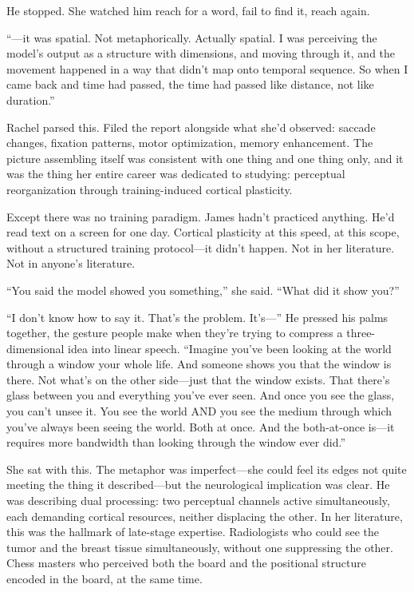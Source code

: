 He stopped. She watched him reach for a word, fail to find it, reach again.

``---it was spatial. Not metaphorically. Actually spatial. I was perceiving the model's output as a structure with dimensions, and moving through it, and the movement happened in a way that didn't map onto temporal sequence. So when I came back and time had passed, the time had passed like distance, not like duration.''

Rachel parsed this. Filed the report alongside what she'd observed: saccade changes, fixation patterns, motor optimization, memory enhancement. The picture assembling itself was consistent with one thing and one thing only, and it was the thing her entire career was dedicated to studying: perceptual reorganization through training-induced cortical plasticity.

Except there was no training paradigm. James hadn't practiced anything. He'd read text on a screen for one day. Cortical plasticity at this speed, at this scope, without a structured training protocol---it didn't happen. Not in her literature. Not in anyone's literature.

``You said the model showed you something,'' she said. ``What did it show you?''

``I don't know how to say it. That's the problem. It's---'' He pressed his palms together, the gesture people make when they're trying to compress a three-dimensional idea into linear speech. ``Imagine you've been looking at the world through a window your whole life. And someone shows you that the window is there. Not what's on the other side---just that the window exists. That there's glass between you and everything you've ever seen. And once you see the glass, you can't unsee it. You see the world AND you see the medium through which you've always been seeing the world. Both at once. And the both-at-once is---it requires more bandwidth than looking through the window ever did.''

She sat with this. The metaphor was imperfect---she could feel its edges not quite meeting the thing it described---but the neurological implication was clear. He was describing dual processing: two perceptual channels active simultaneously, each demanding cortical resources, neither displacing the other. In her literature, this was the hallmark of late-stage expertise. Radiologists who could see the tumor and the breast tissue simultaneously, without one suppressing the other. Chess masters who perceived both the board and the positional structure encoded in the board, at the same time.

